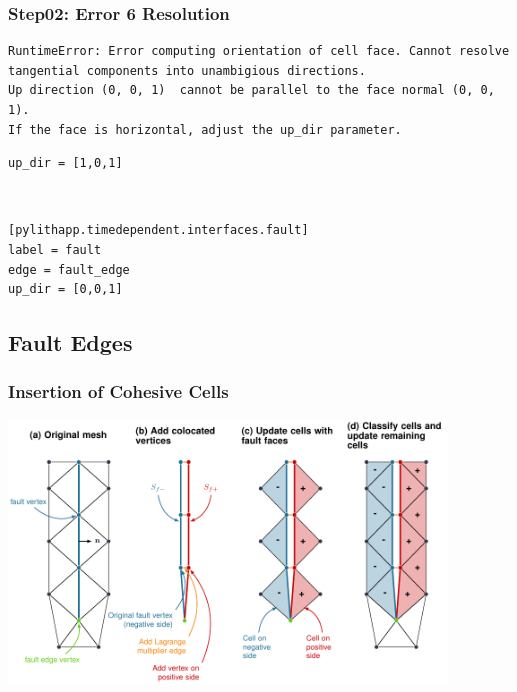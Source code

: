 \documentclass{beamer}
\begin{document}
\begin{frame}[fragile]
  \frametitle{Step02: Error 6 Resolution}

\begin{lstlisting}
RuntimeError: Error computing orientation of cell face. Cannot resolve tangential components into unambigious directions.
Up direction (0, 0, 1)  cannot be parallel to the face normal (0, 0, 1).
If the face is horizontal, adjust the up_dir parameter.
\end{lstlisting}\pause
{} 
\begin{lstlisting}
up_dir = [1,0,1]
\end{lstlisting}\pause
{} \pause\\
 
\begin{lstlisting}
[pylithapp.timedependent.interfaces.fault]
label = fault
edge = fault_edge
up_dir = [0,0,1]
\end{lstlisting}

\end{frame}


\subsection{Fault Edges}

\begin{frame}
  \frametitle{Insertion of Cohesive Cells}
  \summary{}

  \begin{center}
    \includegraphics[height=7.0cm]{figs/cohesivecells}
  \end{center}

\end{frame}
\end{document}
